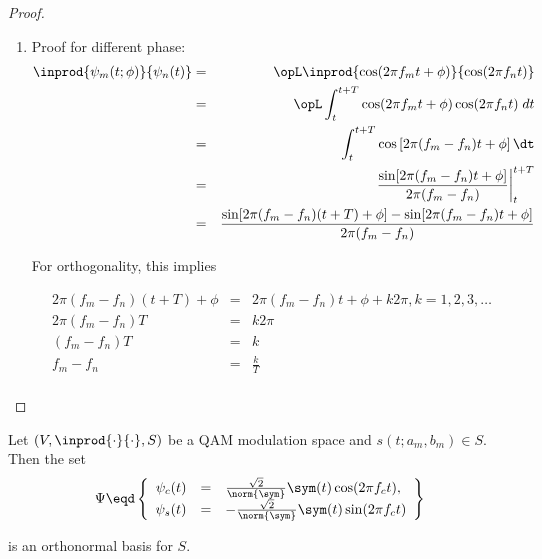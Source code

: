 \begin{proof}
\begin{enumerate}
\item Proof for different phase:
\begin{eqnarray*}
   \inprod{\psi_m(t;\phi)}{\psi_n(t)}
      &=& \opL \inprod{\cos(2\pi f_m t + \phi)}{\cos(2\pi f_n t)}
    \\&=& \opL \int_t^{t+T} \cos(2\pi f_m t + \phi) \cos(2\pi f_n t) \; dt
    \\&=& \int_t^{t+T} \cos\left[2\pi (f_m-f_n) t + \phi\right] \dt
    \\&=& \left.\frac{\sin[2\pi (f_m-f_n) t + \phi]}
                     {2\pi(f_m-f_n)}
          \right|_t^{t+T}
    \\&=& \frac{\sin[2\pi (f_m-f_n)(t+T) + \phi]-\sin[2\pi (f_m-f_n)t + \phi]}{2\pi(f_m-f_n)}
\end{eqnarray*}

For orthogonality, this implies

\begin{eqnarray*}
   2\pi (f_m-f_n)(t+T) + \phi &=& 2\pi (f_m-f_n)t + \phi + k2\pi, k=1,2,3,\ldots \\
   2\pi (f_m-f_n)T  &=& k2\pi \\
   (f_m-f_n)T  &=& k \\
   f_m-f_n  &=& \frac{k}{T} \\
\end{eqnarray*}
\end{enumerate}
\end{proof}

\begin{proposition}
\label{lem:QAM_basis}
Let $(V, \inprod{\cdot}{\cdot}, S)$ be a QAM modulation space and 
$s(t;a_m,b_m)\in S$.
Then the set
\[
   \Psi \eqd \left\{ \begin{array}{rcl}
      \psi_c(t) &=& \frac{\sqrt{2}}{\norm{\sym}} \sym(t) \cos(2\pi f_c t), \\
      \psi_s(t) &=& -\frac{\sqrt{2}}{\norm{\sym}} \sym(t) \sin(2\pi f_c t)
      \end{array}\right\}
\]

is an orthonormal basis for $S$.
\end{proposition}

